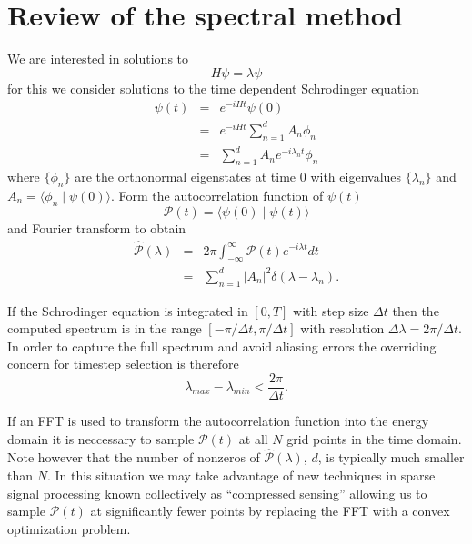 \documentclass[12pt]{amsart}
\theoremstyle{remark}
\begin{document}
\section{Review of the spectral method}

We are interested in solutions to
\begin{equation}
H \psi = \lambda \psi
\end{equation}
for this we consider solutions to the time dependent Schrodinger equation
\begin{eqnarray}
\psi(t) &=& e^{-iHt}\psi(0) \\
&=& e^{-iHt} \sum_{n=1}^d A_n \phi_n \\ \label{timdepcoh}
&=& \sum_{n=1}^d A_n e^{-i\lambda_n t} \phi_n
\end{eqnarray}
where $\{ \phi_n \}$ are the orthonormal eigenstates at time 0 with eigenvalues $\{ \lambda_n \}$ and $A_n = \langle \phi_n \mid \psi(0) \rangle$. Form the autocorrelation function of $\psi(t)$
\begin{equation}\label{autocor}
\mathcal{P}(t) = \langle \psi(0) \mid \psi(t) \rangle
\end{equation}
and Fourier transform to obtain
\begin{eqnarray}
\hat{\mathcal{P}}(\lambda) &=& 2\pi \int_{-\infty}^\infty \mathcal{P}(t) e^{-i\lambda t}dt \\
\label{ftautocor}
&=& \sum_{n=1}^d |A_n|^2 \delta(\lambda - \lambda_n).
\end{eqnarray}

If the Schrodinger equation is integrated in $[0,T]$ with step size $\Delta t$ then the computed spectrum is in the range $[-\pi / \Delta t, \pi / \Delta t]$ with resolution $\Delta \lambda = 2\pi/\Delta t$. In order to capture the full spectrum and avoid aliasing errors the overriding concern for timestep selection is therefore
\begin{equation}
\lambda_{max} - \lambda_{min} < \frac{2\pi}{\Delta t}.
\end{equation}

If an FFT is used to transform the autocorrelation function into the energy domain it is neccessary to sample $\mathcal{P}(t)$ at all $N$ grid points in the time domain. Note however that the number of nonzeros of $\hat{\mathcal{P}}(\lambda)$, $d$, is typically much smaller than $N$. In this situation we may take advantage of new techniques in sparse signal processing known collectively as ``compressed sensing'' allowing us to sample $\mathcal{P}(t)$ at significantly fewer points by replacing the FFT with a convex optimization problem.
\end{document}
